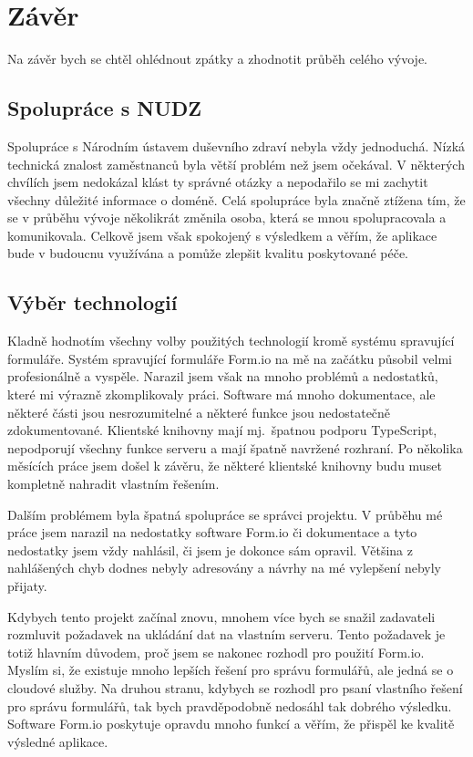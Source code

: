 \chapter*{Závěr}

Na závěr bych se chtěl ohlédnout zpátky a zhodnotit průběh celého vývoje.


\section{Spolupráce s NUDZ}\label{sec:spoluprace-s-nudz}

Spolupráce s Národním ústavem duševního zdraví nebyla vždy jednoduchá.
Nízká technická znalost zaměstnanců byla větší problém než jsem očekával.
V některých chvílích jsem nedokázal klást ty správné otázky a nepodařilo se mi zachytit všechny důležité informace o doméně.
Celá spolupráce byla značně ztížena tím, že se v průběhu vývoje několikrát změnila osoba, která se mnou spolupracovala a komunikovala.
Celkově jsem však spokojený s výsledkem a věřím, že aplikace bude v budoucnu využívána a pomůže zlepšit kvalitu poskytované péče.


\section{Výběr technologií}\label{sec:vyber-technologii-zaver}

Kladně hodnotím všechny volby použitých technologií kromě systému spravující formuláře.
Systém spravující formuláře Form.io na mě na začátku působil velmi profesionálně a vyspěle.
Narazil jsem však na mnoho problémů a nedostatků, které mi výrazně zkomplikovaly práci.
Software má mnoho dokumentace, ale některé části jsou nesrozumitelné a některé funkce jsou nedostatečně zdokumentované.
Klientské knihovny mají mj.\ špatnou podporu TypeScript, nepodporují všechny funkce serveru a mají špatně navržené rozhraní.
Po několika měsících práce jsem došel k závěru, že některé klientské knihovny budu muset kompletně nahradit vlastním řešením.

Dalším problémem byla špatná spolupráce se správci projektu.
V průběhu mé práce jsem narazil na nedostatky software Form.io či dokumentace a tyto nedostatky jsem vždy nahlásil, či jsem je dokonce sám opravil.
Většina z nahlášených chyb dodnes nebyly adresovány a návrhy na mé vylepšení nebyly přijaty.

Kdybych tento projekt začínal znovu, mnohem více bych se snažil zadavateli rozmluvit požadavek na ukládání dat na vlastním serveru.
Tento požadavek je totiž hlavním důvodem, proč jsem se nakonec rozhodl pro použití Form.io.
Myslím si, že existuje mnoho lepších řešení pro správu formulářů, ale jedná se o cloudové služby.
Na druhou stranu, kdybych se rozhodl pro psaní vlastního řešení pro správu formulářů, tak bych pravděpodobně nedosáhl tak dobrého výsledku.
Software Form.io poskytuje opravdu mnoho funkcí a věřím, že přispěl ke kvalitě výsledné aplikace.

